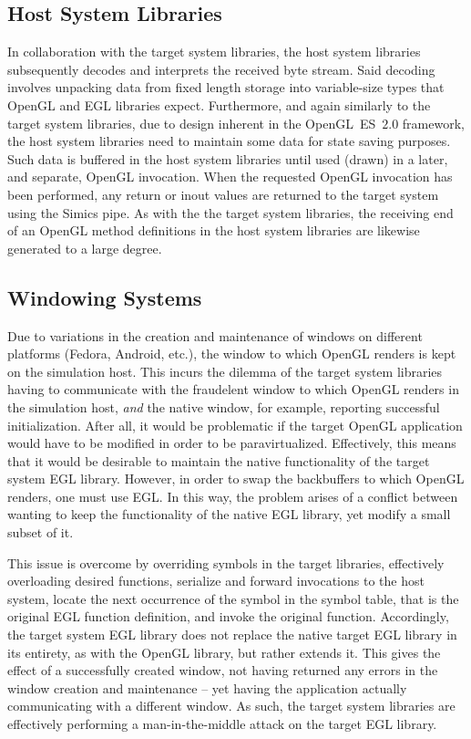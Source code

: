 \subsection{Host System Libraries}
\label{sec:proposedsolutionandimplementation_hostsystemlibraries}
In collaboration with the target system libraries, the host system libraries subsequently decodes and interprets the received byte stream.
Said decoding involves unpacking data from fixed length storage into variable-size types that OpenGL and EGL libraries expect.
Furthermore, and again similarly to the target system libraries, due to design inherent in the OpenGL~ES~$2.0$ framework, the host system libraries need to maintain some data for state saving purposes.
Such data is buffered in the host system libraries until used (drawn) in a later, and separate, OpenGL invocation.
When the requested OpenGL invocation has been performed, any return or inout values are returned to the target system using the Simics pipe.
As with the the target system libraries, the receiving end of an OpenGL method definitions in the host system libraries are likewise generated to a large degree.

\subsection{Windowing Systems}
\label{sec:proposedsolutionandimplementation_windowingsystems}
Due to variations in the creation and maintenance of windows on different platforms (Fedora, Android, etc.), the window to which OpenGL renders is kept on the simulation host.
This incurs the dilemma of the target system libraries having to communicate with the fraudelent window to which OpenGL renders in the simulation host, \textit{and} the native window, for example, reporting successful initialization.
After all, it would be problematic if the target OpenGL application would have to be modified in order to be paravirtualized.
Effectively, this means that it would be desirable to maintain the native functionality of the target system EGL library.
However, in order to swap the backbuffers to which OpenGL renders, one must use EGL.
In this way, the problem arises of a conflict between wanting to keep the functionality of the native EGL library, yet modify a small subset of it.
 
This issue is overcome by overriding symbols in the target libraries, effectively overloading desired functions, serialize and forward invocations to the host system, locate the next occurrence of the symbol in the symbol table, that is the original EGL function definition, and invoke the original function.
Accordingly, the target system EGL library does not replace the native target EGL library in its entirety, as with the OpenGL library, but rather extends it.
This gives the effect of a successfully created window, not having returned any errors in the window creation and maintenance -- yet having the application actually communicating with a different window.
As such, the target system libraries are effectively performing a man-in-the-middle attack on the target EGL library.

